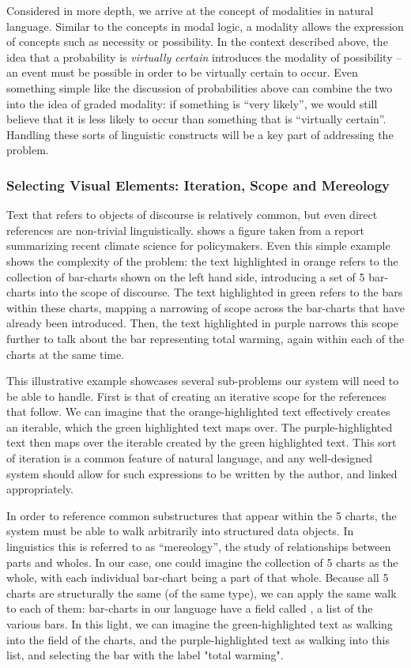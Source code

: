 Considered in more depth, we arrive at the concept of modalities in natural language. Similar to 
the concepts in modal logic, a modality allows the expression of concepts such as necessity or possibility.
In the context described above, the idea that a probability is \emph{virtually certain} introduces the modality of
possibility -- an event must be possible in order to be virtually certain to occur. Even something simple
like the discussion of probabilities above can combine the two into the idea of graded modality:
if something is ``very likely'', we would still believe that it is less likely to occur than something that
is ``virtually certain''. Handling these sorts of linguistic constructs will be a key part of addressing
the problem. 

\subsubsection{Selecting Visual Elements: Iteration, Scope and Mereology}
Text that refers to objects of discourse is relatively common, but even direct references are non-trivial 
linguistically.  shows a figure taken from a report summarizing recent climate 
science for policymakers. Even this simple example shows the complexity of the problem: the text highlighted
in orange refers to the collection of bar-charts shown on the left hand side, introducing a set of 5 bar-charts
into the scope of discourse. The text highlighted in green refers to the bars within these charts, mapping 
a narrowing of scope across the bar-charts that have already been introduced. Then, the text highlighted in
purple narrows this scope further to talk about the bar representing total warming, again within each of the
charts at the same time. 

This illustrative example showcases several sub-problems our system will need to be able to handle. First
is that of creating an iterative scope for the references that follow. We can imagine that the orange-highlighted
text effectively creates an iterable, which the green highlighted text maps over. The purple-highlighted text
then maps over the iterable created by the green highlighted text. This sort of iteration is a common feature of natural language,
and any well-designed system should allow for such expressions to be written by the author, and linked appropriately.

In order to reference common substructures that appear within the 5 charts, the system must be able to walk arbitrarily 
into structured data objects. In linguistics this is referred to as ``mereology'', the study of relationships
between parts and wholes. In our case, one could imagine the collection of 5 charts as the whole, with each
individual bar-chart being a part of that whole. Because all 5 charts are structurally the same (of the same type),
we can apply the same walk to each of them: bar-charts in our language have a field called , a list
of the various bars. In this light, we can imagine the green-highlighted text as walking into the  field
of the charts, and the purple-highlighted text as walking into this list, and selecting the bar with the label "total warming".

